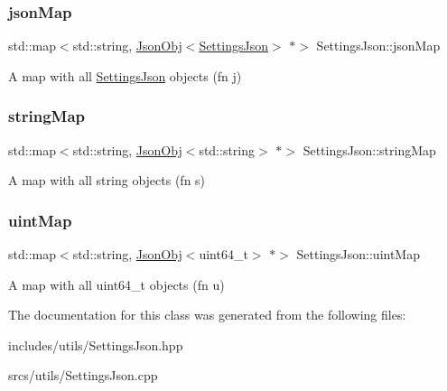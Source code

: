 \subsubsection{\texorpdfstring{json\+Map}{jsonMap}}
{\footnotesize\ttfamily std\+::map$<$std\+::string, \hyperlink{class_json_obj}{Json\+Obj}$<$\hyperlink{class_settings_json}{Settings\+Json}$>$ $\ast$$>$ Settings\+Json\+::json\+Map}

A map with all \hyperlink{class_settings_json}{Settings\+Json} objects (fn j) \mbox{\label{class_settings_json_a84ac99a71e39c546ac5b685acf7d57ec}} 
\subsubsection{\texorpdfstring{string\+Map}{stringMap}}
{\footnotesize\ttfamily std\+::map$<$std\+::string, \hyperlink{class_json_obj}{Json\+Obj}$<$std\+::string$>$ $\ast$$>$ Settings\+Json\+::string\+Map}

A map with all string objects (fn s) \mbox{\label{class_settings_json_a6ccee345ddcbf7f3bf8e8d5095153b35}} 
\subsubsection{\texorpdfstring{uint\+Map}{uintMap}}
{\footnotesize\ttfamily std\+::map$<$std\+::string, \hyperlink{class_json_obj}{Json\+Obj}$<$uint64\+\_\+t$>$ $\ast$$>$ Settings\+Json\+::uint\+Map}

A map with all uint64\+\_\+t objects (fn u) 

The documentation for this class was generated from the following files\+:\begin{DoxyCompactItemize}
\item 
includes/utils/Settings\+Json.\+hpp\item 
srcs/utils/Settings\+Json.\+cpp\end{DoxyCompactItemize}

